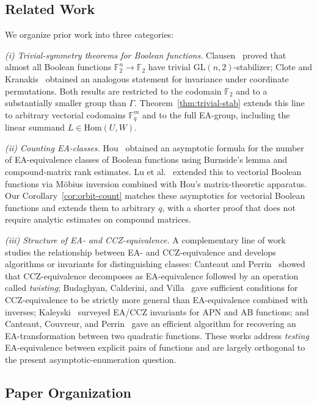 \documentclass[11pt]{article}
\theoremstyle{definition}
\newcommand{\F}{\mathbb{F}}
\newcommand{\Gam}{\Gamma}
\newcommand{\GL}{\mathrm{GL}}
\newcommand{\Hom}{\mathrm{Hom}}
\begin{document}
\subsection{Related Work}
We organize prior work into three categories:

\emph{(i) Trivial-symmetry theorems for Boolean functions.}
Clausen~\cite{clausen1992} proved that almost all Boolean functions $\F_2^n\to\F_2$ have
trivial $\GL(n,2)$-stabilizer; Clote and Kranakis~\cite{clote1991} obtained an
analogous statement for invariance under coordinate permutations. Both results are
restricted to the codomain $\F_2$ and to a substantially smaller group than $\Gam$.
Theorem~\ref{thm:trivial-stab} extends this line to arbitrary vectorial codomains
$\F_q^m$ and to the full EA-group, including the linear summand $L\in\Hom(U,W)$.

\emph{(ii) Counting EA-classes.}
Hou~\cite{hou2021} obtained an asymptotic formula for the number of EA-equivalence
classes of Boolean functions using Burnside's lemma and compound-matrix rank estimates.
Lu et al.~\cite{lu2023} extended this to vectorial Boolean functions via M\"obius
inversion combined with Hou's matrix-theoretic apparatus. Our
Corollary~\ref{cor:orbit-count} matches these asymptotics for vectorial Boolean
functions and extends them to arbitrary $q$, with a shorter proof that does not require
analytic estimates on compound matrices.

\emph{(iii) Structure of EA- and CCZ-equivalence.}
A complementary line of work studies the relationship between EA- and CCZ-equivalence
and develops algorithms or invariants for distinguishing classes:
Canteaut and Perrin~\cite{canteaut2019} showed that CCZ-equivalence decomposes as
EA-equivalence followed by an operation called \emph{twisting};
Budaghyan, Calderini, and Villa~\cite{budaghyan2020} gave sufficient conditions for
CCZ-equivalence to be strictly more general than EA-equivalence combined with inverses;
Kaleyski~\cite{kaleyski2021} surveyed EA/CCZ invariants for APN and AB functions; and
Canteaut, Couvreur, and Perrin~\cite{canteaut2022} gave an efficient algorithm for
recovering an EA-transformation between two quadratic functions.
These works address \emph{testing} EA-equivalence between explicit pairs of functions
and are largely orthogonal to the present asymptotic-enumeration question.

\subsection{Paper Organization}
\end{document}

